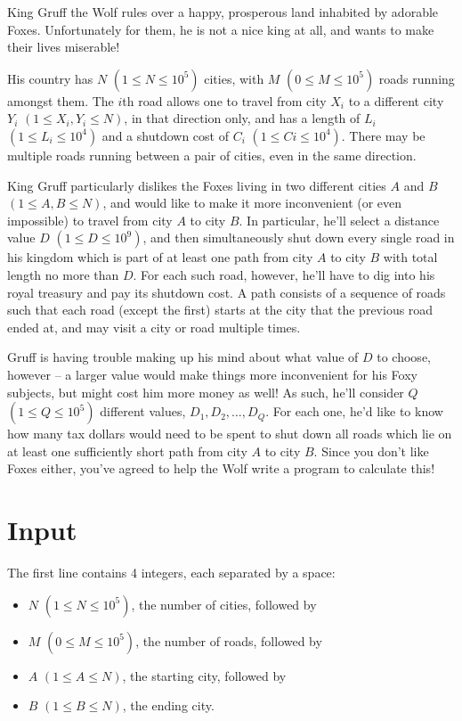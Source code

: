 King Gruff the Wolf rules over a happy, prosperous land inhabited by adorable Foxes. Unfortunately for them, he is not a nice king at all, and wants to make their lives miserable!

His country has $N$ $(1 \leq N \leq 10^5)$ cities, with $M$ $(0 \leq M \leq 10^5)$ roads running
amongst them. The $i$th road allows one to travel from city $X_i$ to a different city $Y_i$ $(1 \leq
X_i,Y_i \leq N)$, in that direction only, and has a length of $L_i$ $(1 \leq L_i \leq 10^4)$ and a
shutdown cost of $C_i$ $(1 \leq Ci \leq 10^4)$. There may be multiple roads running between a pair
of cities, even in the same direction.

King Gruff particularly dislikes the Foxes living in two different cities $A$ and $B$ $(1 \leq A,B
\leq N)$, and would like to make it more inconvenient (or even impossible) to travel from city $A$
to city $B$. In particular, he'll select a distance value $D$ $(1 \leq D \leq 10^9)$, and then
simultaneously shut down every single road in his kingdom which is part of at least one path from
city $A$ to city $B$ with total length no more than $D$. For each such road, however, he'll have to
dig into his royal treasury and pay its shutdown cost. A path consists of a sequence of roads such
that each road (except the first) starts at the city that the previous road ended at, and may visit
a city or road multiple times.

Gruff is having trouble making up his mind about what value of $D$ to choose, however -- a larger
value would make things more inconvenient for his Foxy subjects, but might cost him more money as
well! As such, he'll consider $Q$ $(1 \leq Q \leq 10^5)$ different values, $D_1, D_2, \ldots, D_Q$.
For each one, he'd like to know how many tax dollars would need to be spent to shut down all roads
which lie on at least one sufficiently short path from city $A$ to city $B$. Since you don't like
Foxes either, you've agreed to help the Wolf write a program to calculate this!

\section*{Input}
The first line contains 4 integers, each separated by a space:

\begin{itemize}
\item $N$ $(1 \leq N \leq 10^5)$, the number of cities, followed by
\item $M$ $(0 \leq M \leq 10^5)$, the number of roads, followed by
\item $A$ $(1 \leq A \leq N)$, the starting city, followed by
\item $B$ $(1 \leq B \leq N)$, the ending city.
\end{itemize}

